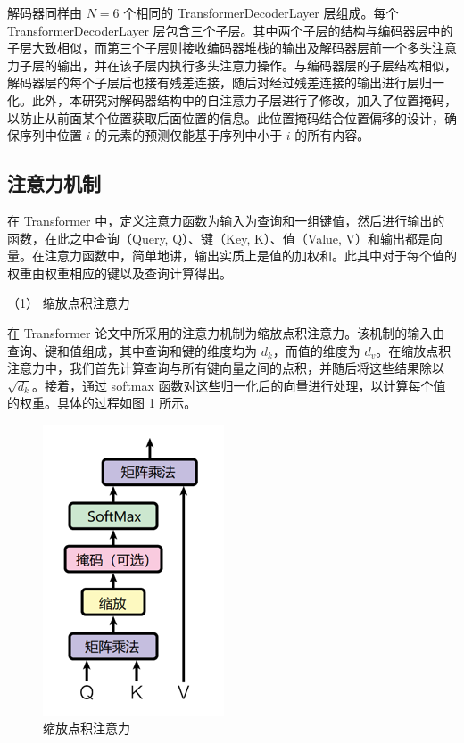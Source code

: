 解码器同样由 \(N=6\) 个相同的 TransformerDecoderLayer 层组成。每个 TransformerDecoderLayer 层包含三个子层。其中两个子层的结构与编码器层中的子层大致相似，而第三个子层则接收编码器堆栈的输出及解码器层前一个多头注意力子层的输出，并在该子层内执行多头注意力操作。与编码器层的子层结构相似，解码器层的每个子层后也接有残差连接，随后对经过残差连接的输出进行层归一化。此外，本研究对解码器结构中的自注意力子层进行了修改，加入了位置掩码，以防止从前面某个位置获取后面位置的信息。此位置掩码结合位置偏移的设计，确保序列中位置 \(i\) 的元素的预测仅能基于序列中小于 \(i\) 的所有内容。

\subsection{注意力机制}

在 Transformer 中，定义注意力函数为输入为查询和一组键值，然后进行输出的函数，在此之中查询（Query, Q）、键（Key, K）、值（Value, V）和输出都是向量。在注意力函数中，简单地讲，输出实质上是值的加权和。此其中对于每个值的权重由权重相应的键以及查询计算得出。

（1） 缩放点积注意力

在 Transformer 论文中所采用的注意力机制为缩放点积注意力。该机制的输入由查询、键和值组成，其中查询和键的维度均为 \(d_k\)，而值的维度为 \(d_v\)。在缩放点积注意力中，我们首先计算查询与所有键向量之间的点积，并随后将这些结果除以 \(\sqrt{d_k}\)。接着，通过 softmax 函数对这些归一化后的向量进行处理，以计算每个值的权重。具体的过程如图 \ref{fig:DotAtt} 所示。

\begin{figure}[htbp]
	\centering
	\includegraphics[scale = 0.8]{figures/DotAtt}
	\caption{缩放点积注意力 \cite{transformer}}
	\label{fig:DotAtt}
\end{figure}

